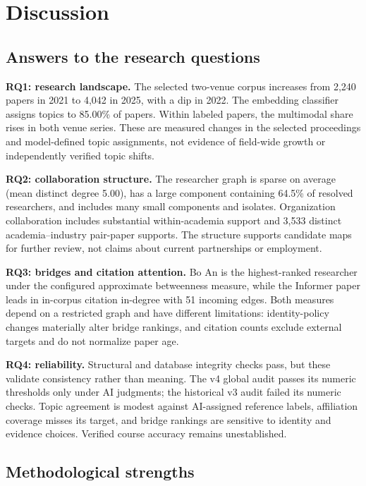 \chapter{Discussion}
\label{chap:discussion}

\section{Answers to the research questions}

\textbf{RQ1: research landscape.} The selected two-venue corpus increases from
2,240 papers in 2021 to 4,042 in 2025, with a dip in 2022. The embedding
classifier assigns topics to 85.00\% of papers. Within labeled papers, the
multimodal share rises in both venue series. These are measured changes in the
selected proceedings and model-defined topic assignments, not evidence of
field-wide growth or independently verified topic shifts.

\textbf{RQ2: collaboration structure.} The researcher graph is sparse on average
(mean distinct degree 5.00), has a large component containing 64.5\% of resolved
researchers, and includes many small components and isolates. Organization
collaboration includes substantial within-academia support and 3,533 distinct
academia--industry pair-paper supports. The structure supports candidate maps for
further review, not claims about current partnerships or employment.

\textbf{RQ3: bridges and citation attention.} Bo An is the highest-ranked
researcher under the configured approximate betweenness measure, while the
Informer paper leads in in-corpus citation in-degree with 51 incoming edges.
Both measures depend on a restricted graph and have different limitations:
identity-policy changes materially alter bridge rankings, and citation counts
exclude external targets and do not normalize paper age.

\textbf{RQ4: reliability.} Structural and database integrity checks pass, but
these validate consistency rather than meaning. The v4 global audit passes its
numeric thresholds only under AI judgments; the historical v3 audit failed its
numeric checks. Topic agreement is modest against AI-assigned reference labels,
affiliation coverage misses its target, and bridge rankings are sensitive to
identity and evidence choices. Verified course accuracy remains unestablished.

\section{Methodological strengths}

